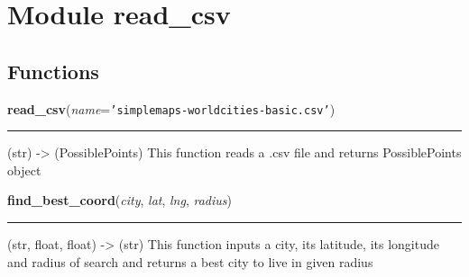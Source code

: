 %
%
%


\section{Module read\_csv}

    \label{read_csv}


  \subsection{Functions}

    \label{read_csv:read_csv}

    \vspace{0.5ex}

\hspace{.8\funcindent}\begin{boxedminipage}{\funcwidth}

    \raggedright \textbf{read\_csv}(\textit{name}={\tt 'simplemaps-worldcities-basic.csv'})

    \vspace{-1.5ex}

    \rule{\textwidth}{0.5\fboxrule}
\setlength{\parskip}{2ex}
    (str) -{\textgreater} (PossiblePoints) This function reads a .csv file 
    and returns PossiblePoints object

\setlength{\parskip}{1ex}
    \end{boxedminipage}

    \label{read_csv:find_best_coord}

    \vspace{0.5ex}

\hspace{.8\funcindent}\begin{boxedminipage}{\funcwidth}

    \raggedright \textbf{find\_best\_coord}(\textit{city}, \textit{lat}, \textit{lng}, \textit{radius})

    \vspace{-1.5ex}

    \rule{\textwidth}{0.5\fboxrule}
\setlength{\parskip}{2ex}
    (str, float, float) -{\textgreater} (str) This function inputs a city, 
    its latitude, its longitude and radius of search and returns a best 
    city to live in given radius

\setlength{\parskip}{1ex}
    \end{boxedminipage}

